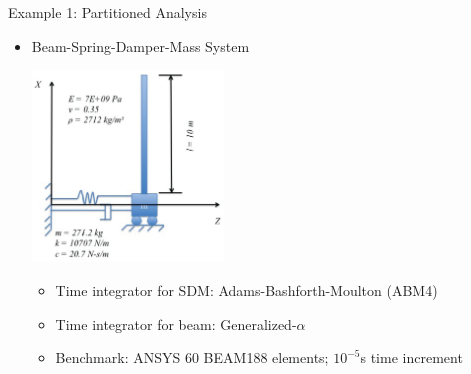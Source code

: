 \documentclass[xcolor=cmyk]{beamer}
\begin{document}
\begin{frame}{Example 1: Partitioned Analysis}

   \begin{itemize}
    \item 
    Beam-Spring-Damper-Mass System
    \begin{center}
    \includegraphics[width=2.0in]{EPSF/CoupledSystem.eps}
    \end{center}
    \begin{itemize}
        \item
        Time integrator for SDM: Adams-Bashforth-Moulton (ABM4)
        \item
        Time integrator for beam: Generalized-$\alpha$
        \item
        Benchmark: ANSYS 60 BEAM188 elements; $10^{-5}$s time increment
    \end{itemize}
    \end{itemize}
    

\end{frame}
\end{document}
